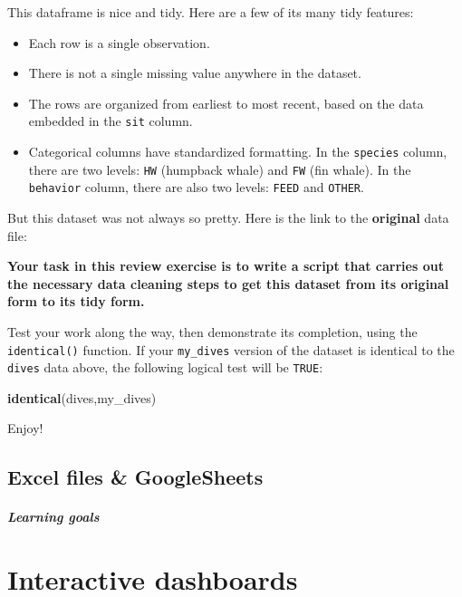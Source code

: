 \documentclass[
]{book}
\newenvironment{Shaded}{\begin{snugshade}}{\end{snugshade}}
\newcommand{\KeywordTok}[1]{\textcolor[rgb]{0.13,0.29,0.53}{\textbf{#1}}}
\newcommand{\NormalTok}[1]{#1}
\begin{document}
This dataframe is nice and tidy. Here are a few of its many tidy features:

\begin{itemize}
\item
  Each row is a single observation.
\item
  There is not a single missing value anywhere in the dataset.
\item
  The rows are organized from earliest to most recent, based on the data embedded in the \texttt{sit} column.
\item
  Categorical columns have standardized formatting. In the \texttt{species} column, there are two levels: \texttt{HW} (humpback whale) and \texttt{FW} (fin whale). In the \texttt{behavior} column, there are also two levels: \texttt{FEED} and \texttt{OTHER}.
\end{itemize}

But this dataset was not always so pretty. Here is the link to the \textbf{original} data file:

\textbf{Your task in this review exercise is to write a script that carries out the necessary data cleaning steps to get this dataset from its original form to its tidy form.}

Test your work along the way, then demonstrate its completion, using the \texttt{identical()} function. If your \texttt{my\_dives} version of the dataset is identical to the \texttt{dives} data above, the following logical test will be \texttt{TRUE}:

\begin{Shaded}
\begin{Highlighting}[]
\KeywordTok{identical}\NormalTok{(dives,my_dives)}
\end{Highlighting}
\end{Shaded}

Enjoy!

\hypertarget{excel-files-googlesheets}{%
\chapter{Excel files \& GoogleSheets}\label{excel-files-googlesheets}}

\hypertarget{learning-goals-20}{%
\subsubsection*{Learning goals}\label{learning-goals-20}}

\hypertarget{part-interactive-dashboards}{%
\part{Interactive dashboards}\label{part-interactive-dashboards}}
\end{document}
